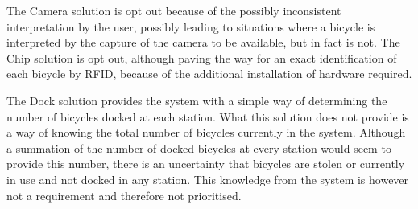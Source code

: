 The Camera solution is opt out because of the possibly inconsistent interpretation by the user, possibly leading to situations where a bicycle is interpreted by the capture of the camera to be available, but in fact is not. 
The Chip solution is opt out, although paving the way for an exact identification of each bicycle by RFID, because of the additional installation of hardware required.

The Dock solution provides the system with a simple way of determining the number of bicycles docked at each station. What this solution does not provide is a way of knowing the total number of bicycles currently in the system. Although a summation of the number of docked bicycles at every station would seem to provide this number, there is an uncertainty that bicycles are stolen or currently in use and not docked in any station. This knowledge from the system is however not a requirement and therefore not prioritised.
